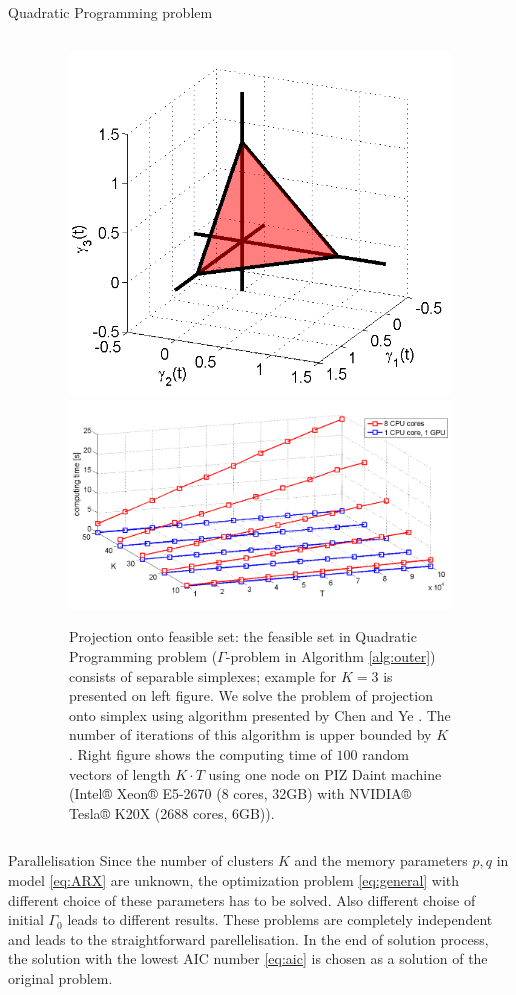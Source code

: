 \documentclass[final,hyperref={pdfpagelabels=false}]{beamer}
\begin{document}
\begin{frame}[t]
\begin{columns}[t]
\begin{column}{.48\textwidth}
\begin{block}{Quadratic Programming problem}
\begin{columns}[T]
\begin{column}{0.02\linewidth}\end{column}
\begin{column}{0.94\linewidth}
	\begin{figure}[H]
		\begin{center}
			\includegraphics[width=0.3\linewidth, angle=0, clip = true]{figures/simplex.png}
			\hfil
			\includegraphics[width=0.5\linewidth, angle=0, clip = true]{figures/projection.png}
			\caption{Projection onto feasible set: the feasible set in Quadratic Programming problem ($\Gamma$-problem in Algorithm \ref{alg:outer}) consists of 
			separable simplexes; example for $K=3$ is presented on left figure.
			We solve the problem of projection onto simplex using algorithm presented by Chen and Ye \cite{simplex}. The number of iterations of this algorithm is upper bounded by $K$.
			Right figure shows the computing time of $100$ random vectors of length $K \cdot T$ using one node on PIZ Daint machine (Intel® Xeon® E5-2670 (8 cores, 32GB) with NVIDIA® Tesla® K20X (2688 cores, 6GB)).
			}
		\end{center}
	\end{figure}
\end{column}	
\begin{column}{0.02\linewidth}\end{column}
\end{columns}

\end{block}



\begin{block}{Parallelisation}
Since the number of clusters $K$ and the memory parameters $p,q$ in model \eqref{eq:ARX} are unknown, the optimization problem \eqref{eq:general}
with different choice of these parameters has to be solved. Also different choise of initial $\Gamma_0$ leads to different results.
These problems are completely independent and leads to the straightforward parellelisation. In the end of solution process, the solution with the lowest AIC number \eqref{eq:aic}
is chosen as a solution of the original problem. \newline


\end{block}
\end{column}
\end{columns}
\end{frame}
\end{document}

